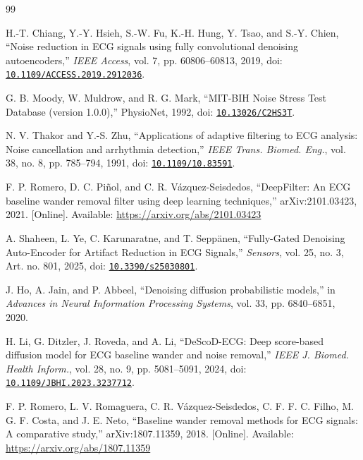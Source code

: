\documentclass[conference]{IEEEtran}
\begin{document}
\begin{thebibliography}{99}

H.-T. Chiang, Y.-Y. Hsieh, S.-W. Fu, K.-H. Hung, Y. Tsao, and S.-Y. Chien, ``Noise reduction in ECG signals using fully convolutional denoising autoencoders,'' \textit{IEEE Access}, vol. 7, pp. 60806--60813, 2019, doi: \href{https://doi.org/10.1109/ACCESS.2019.2912036}{\nolinkurl{10.1109/ACCESS.2019.2912036}}.

G. B. Moody, W. Muldrow, and R. G. Mark, ``MIT-BIH Noise Stress Test Database (version 1.0.0),'' PhysioNet, 1992, doi: \href{https://doi.org/10.13026/C2HS3T}{\nolinkurl{10.13026/C2HS3T}}.

N. V. Thakor and Y.-S. Zhu, ``Applications of adaptive filtering to ECG analysis: Noise cancellation and arrhythmia detection,'' \textit{IEEE Trans. Biomed. Eng.}, vol. 38, no. 8, pp. 785--794, 1991, doi: \href{https://doi.org/10.1109/10.83591}{\nolinkurl{10.1109/10.83591}}.

F. P. Romero, D. C. Piñol, and C. R. Vázquez-Seisdedos, ``DeepFilter: An ECG baseline wander removal filter using deep learning techniques,'' arXiv:2101.03423, 2021. [Online]. Available: \url{https://arxiv.org/abs/2101.03423}

A. Shaheen, L. Ye, C. Karunaratne, and T. Seppänen, ``Fully-Gated Denoising Auto-Encoder for Artifact Reduction in ECG Signals,'' \textit{Sensors}, vol. 25, no. 3, Art. no. 801, 2025, doi: \href{https://doi.org/10.3390/s25030801}{\nolinkurl{10.3390/s25030801}}.

J. Ho, A. Jain, and P. Abbeel, ``Denoising diffusion probabilistic models,'' in \textit{Advances in Neural Information Processing Systems}, vol. 33, pp. 6840--6851, 2020.

H. Li, G. Ditzler, J. Roveda, and A. Li, ``DeScoD-ECG: Deep score-based diffusion model for ECG baseline wander and noise removal,'' \textit{IEEE J. Biomed. Health Inform.}, vol. 28, no. 9, pp. 5081--5091, 2024, doi: \href{https://doi.org/10.1109/JBHI.2023.3237712}{\nolinkurl{10.1109/JBHI.2023.3237712}}.

F. P. Romero, L. V. Romaguera, C. R. Vázquez-Seisdedos, C. F. F. C. Filho, M. G. F. Costa, and J. E. Neto, ``Baseline wander removal methods for ECG signals: A comparative study,'' arXiv:1807.11359, 2018. [Online]. Available: \url{https://arxiv.org/abs/1807.11359}


\end{thebibliography}
\end{document}
